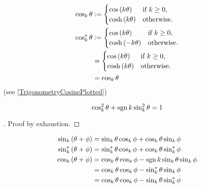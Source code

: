 \documentclass[stu, babel, american, biblatex, a4paper, leqno, draftall]{apa7}
\begin{document}
\begin{example}\label{M:Trigonometry:Cosine}
    \begin{align*}
        \cos_k{\theta} & \vcentcolon=
        \begin{cases}
            \cos\left(k\theta\right)  & \text{if $k\geq0$,} \\
            \cosh\left(k\theta\right) & \text{otherwise.}   \\
        \end{cases} \\
        \cos_k^\ast{\theta} & \vcentcolon=
        \begin{cases}
            \cos\left(k\theta\right)  & \text{if $k\geq0$,} \\
            \cosh\left(-k\theta\right) & \text{otherwise.}   \\
        \end{cases} \\
        & = \begin{cases}
            \cos\left(k\theta\right)  & \text{if $k\geq0$,} \\
            \cosh\left(k\theta\right) & \text{otherwise.}   \\
        \end{cases} \\
        & = \cos_k{\theta}
    \end{align*}
    (see \cref{TrigonometryCosinePlotted})
\end{example}
\begin{theorem}\label{M:Trigonometry:Pythagorean}
    \begin{equation*}
        \cos_k^2{\theta} +\operatorname{sgn}{k}\sin_k^2{\theta} = 1
    \end{equation*}
\end{theorem}
\begin{proof}[]
    Proof by exhaustion.
\end{proof}
\begin{proposition}\label{M:Trigonometry:Sum}
    \begin{align*}
        \sin_k\left(\theta+\phi\right)
        &= \sin_k{\theta}\cos_k{\phi}+\cos_k{\theta}\sin_k{\phi} \\
        \sin_k^\ast\left(\theta+\phi\right)
        &= \sin_k^\ast{\theta}\cos_k{\phi}+\cos_k{\theta}\sin_k^\ast{\phi} \\
        \cos_k\left(\theta+\phi\right)
        &= \cos_k{\theta}\cos_k{\phi}-\operatorname{sgn}{k}\sin_k{\theta}\sin_k{\phi} \\
        &= \cos_k{\theta}\cos_k{\phi}-\sin_k^\ast{\theta}\sin_k{\phi} \\
        &= \cos_k{\theta}\cos_k{\phi}-\sin_k{\theta}\sin_k^\ast{\phi}
    \end{align*}
\end{proposition}
\end{document}
